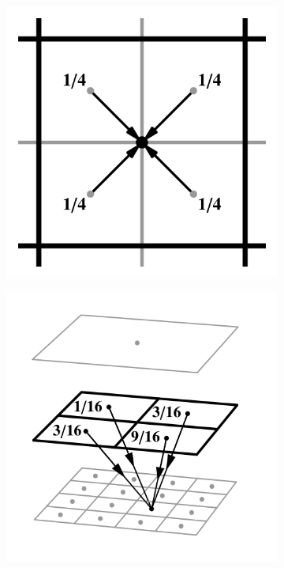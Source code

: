 \begin{figure}[htb]
\begin{subfigure}[b]{0.25\textwidth}
    \centering\includegraphics[width=\textwidth]{graphics/pull_weights_marroquim2}
    \caption{\label{fig:concept:weights_marroquim2}}
  \end{subfigure}%
  \begin{subfigure}[b]{0.25\textwidth}
    \centering\includegraphics[width=\textwidth]{graphics/push_weights_marroquim1}

\end{subfigure}
\end{figure}
